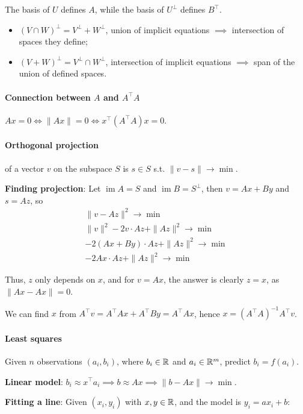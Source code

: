 \documentclass{article}
\begin{document}
The basis of $U$ defines $A$, while the basis of $U^\perp$ defines $B^\top$.

\begin{itemize}
    \item $(V \cap W)^\perp = V^\perp + W^\perp$, union of implicit equations $\implies$ intersection of spaces they define;
    \item $(V+W)^\perp = V^\perp \cap W^\perp$, intersection of implicit equations $\implies$ span of the union of defined spaces.
\end{itemize}

\paragraph{Connection between $A$ and $A^\top A$} $Ax = 0 \iff \|Ax\| = 0 \iff x^\top (A^\top A) x = 0$.

\paragraph{Orthogonal projection} of a vector $v$ on the subspace $S$ is $s \in S$ s.t. $\|v - s\| \to \min$.

\textbf{Finding projection}: Let $\operatorname{im} A = S$ and $\operatorname{im} B = S^\perp$, then $v = Ax + By$ and $s = Az$, so
\begin{gather*}
    \|v - Az\|^2 \to \min \\
    \|v\|^2 - 2 v \cdot Az + \|Az\|^2 \to \min \\
    -2(Ax+By) \cdot Az + \|Az\|^2 \to \min \\
    -2Ax \cdot Az + \|Az\|^2 \to \min
\end{gather*}

Thus, $z$ only depends on $x$, and for $v=Ax$, the answer is clearly $z=x$, as $\|Ax - Ax\| = 0$.

We can find $x$ from $A^\top v = A^\top A x + A^\top B y = A^\top A x$, hence $x = (A^\top A)^{-1} A^\top v$.

\paragraph{Least squares} Given $n$ observations $(a_i, b_i)$, where $b_i \in \mathbb{R}$ and $a_i \in \mathbb{R}^m$, predict $b_i = f(a_i)$.

\textbf{Linear model}: $b_i \approx x^\top a_i \implies b \approx Ax \implies \|b - Ax\| \to \min$.

\textbf{Fitting a line}: Given $(x_i, y_i)$ with $x, y \in \mathbb{R}$, and the model is $y_i = ax_i + b$:
\end{document}
